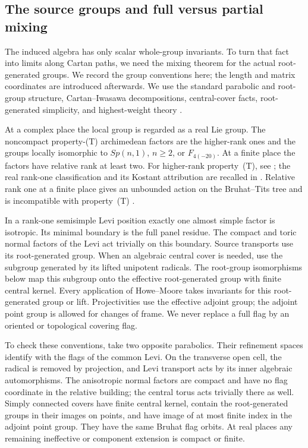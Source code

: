 \subsection{The source groups and full versus partial mixing}

The induced algebra has only scalar whole-group invariants. To turn
that fact into limits along Cartan paths, we need the mixing theorem
for the actual root-generated groups. We record the group conventions
here; the length and matrix coordinates are introduced afterwards.
We use the standard parabolic and root-group structure,
Cartan--Iwasawa decompositions, central-cover facts, root-generated
simplicity, and highest-weight theory
\cite{Borel1991,BT1965,BruhatTits1972,BruhatTits1984,Tits1964,Humphreys1972}.

\begin{convention}
\label{conv:setup-panels}
At a complex place the local group is regarded as a real Lie group.
The noncompact property-(T) archimedean factors are the higher-rank
ones and the groups locally isomorphic to $Sp(n,1)$, $n\geq2$, or
$F_{4(-20)}$.  At a finite place the factors have relative rank at
least two. For higher-rank property~(T), see
\cite[Theorem~6]{DelarocheKirillov1968}; the real rank-one
classification and its Kostant attribution are recalled in
\cite[Section~3.3 and Theorem~3.5.4]{BHV2008}. Relative rank one
at a finite place gives an unbounded action on the Bruhat--Tits tree
and is incompatible with property~(T) \cite[Remark~1.6.3]{BHV2008}.

In a rank-one semisimple Levi position exactly one almost simple
factor is isotropic.  Its minimal boundary is the full panel residue.
The compact and toric normal factors of the Levi act trivially on
this boundary.  Source transports use its root-generated group.
When an algebraic central cover is needed, use the subgroup generated
by its lifted unipotent radicals.  The root-group isomorphisms below
map this subgroup onto the effective root-generated group with finite
central kernel.  Every application of Howe--Moore takes invariants
for this root-generated group or lift.
Projectivities use the effective adjoint group; the adjoint point
group is allowed for changes of frame.  We never replace a full flag
by an oriented or topological covering flag.
\end{convention}

To check these conventions, take two opposite parabolics.  Their
refinement spaces identify with the flags of the common Levi.  On
the transverse open cell, the radical is removed by projection, and
Levi transport acts by its inner algebraic automorphisms.  The
anisotropic normal factors are compact and have no flag coordinate
in the relative building; the central torus acts trivially there as
well.  Simply connected covers have finite central kernel, contain
the root-generated groups in their images on points, and have image
of at most finite index in the adjoint point group.  They have the
same Bruhat flag orbits.  At real places any remaining ineffective
or component extension is compact or finite.


